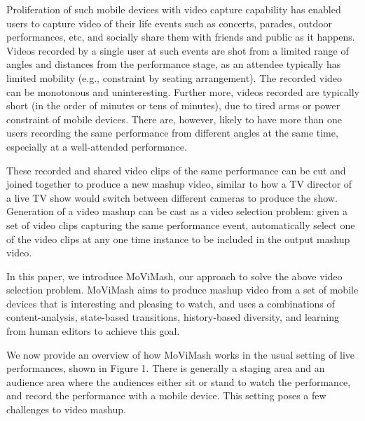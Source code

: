 \documentclass{clsfile}
\begin{document}
Proliferation of such mobile devices with video capture capability has enabled users to capture video of their life events such as concerts, parades, outdoor performances, etc, and socially share them with friends and public as it happens. Videos recorded by a single user at such events are shot from a limited range of angles and distances from the performance stage, as an attendee typically has limited mobility (e.g., constraint by seating arrangement). The recorded video can be monotonous and uninteresting. Further more, videos recorded are typically short (in the order of minutes or tens of minutes), due to tired arms or power constraint of mobile devices. There are, however, likely to have more than one users recording the same performance from different angles at the same time, especially at a well-attended performance.

These recorded and shared video clips of the same performance can be cut and joined together to produce a new mashup video, similar to how a TV director of a live TV show would switch between different cameras to produce the show. Generation of a video mashup can be cast as a video selection problem: given a set of video clips capturing the same performance event, automatically select one of the video clips at any one time instance to be included in the output mashup video.

In this paper, we introduce MoViMash, our approach to solve the above video selection problem. MoViMash aims to produce mashup video from a set of mobile devices that is interesting and pleasing to watch, and uses a combinations of content-analysis, state-based transitions, history-based diversity, and learning from human editors to achieve this goal.

We now provide an overview of how MoViMash works in the usual setting of live performances, shown in Figure 1. There is generally a staging area and an audience area where the audiences either sit or stand to watch the performance, and record the performance with a mobile device. This setting poses a few challenges to video mashup.
\end{document}
